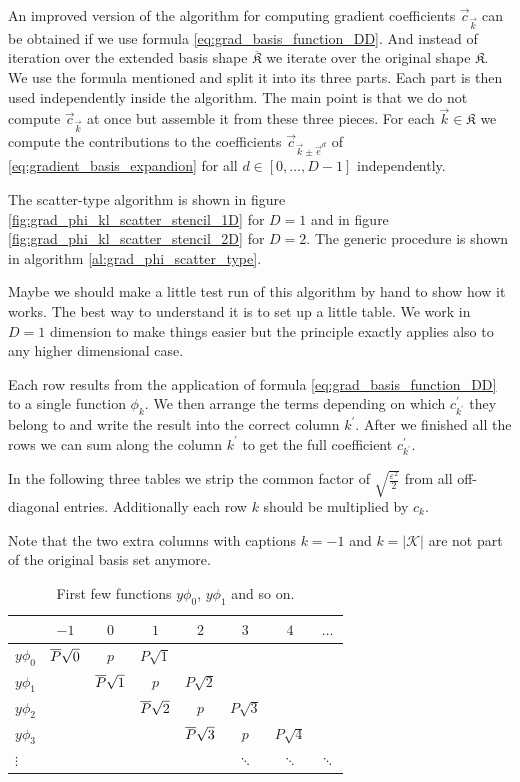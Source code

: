 An improved version of the algorithm for computing gradient coefficients $\vec{c}_{\vec{k}}$
can be obtained if we use formula \eqref{eq:grad_basis_function_DD}. And instead
of iteration over the extended basis shape $\overline{\mathfrak{K}}$ we iterate
over the original shape $\mathfrak{K}$. We use the formula mentioned and split it
into its three parts. Each part is then used independently inside the algorithm.
The main point is that we do not compute $\vec{c}_{\vec{k}}$ at once but assemble
it from these three pieces. For each $\vec{k} \in \mathfrak{K}$ we compute the
contributions to the coefficients $\vec{c}_{\vec{k}\pm \vec{e}^d}$ of
\eqref{eq:gradient_basis_expandion} for all $d \in [0, \ldots, D-1]$ independently.

The scatter-type algorithm is shown in figure \ref{fig:grad_phi_kl_scatter_stencil_1D}
for $D=1$ and in figure \ref{fig:grad_phi_kl_scatter_stencil_2D} for $D=2$.
The generic procedure is shown in algorithm \ref{al:grad_phi_scatter_type}.

Maybe we should make a little test run of this algorithm by hand to show how it works.
The best way to understand it is to set up a little table. We work in $D=1$ dimension
to make things easier but the principle exactly applies also to any higher
dimensional case.

Each row results from the application of formula \eqref{eq:grad_basis_function_DD}
to a single function $\phi_k$. We then arrange the terms depending on which $c^\prime_{k^\prime}$
they belong to and write the result into the correct column $k^\prime$. After we
finished all the rows we can sum along the column $k^\prime$ to get the full coefficient $c^\prime_{k^\prime}$.

In the following three tables we strip the common factor of $\sqrt{\frac{\varepsilon^2}{2}}$
from all off-diagonal entries. Additionally each row $k$ should be multiplied by $c_k$.

Note that the two extra columns with captions $k=-1$ and $k=|\mathcal{K}|$ are not part of
the original basis set anymore.

\begin{table}
\begin{center}
\begin{tabular}[]{|l|c|cccccc|}
\hline
           & $-1$ & $0$ & $1$ & $2$ & $3$ & $4$ & $\hdots$ \\
\hline
$y \phi_0$ & $\overline{P} \sqrt{0}$ & $p$ & $P \sqrt{1}$ & & & & \\
$y \phi_1$ & & $\overline{P} \sqrt{1}$ & $p$ & $P \sqrt{2}$ & & & \\
$y \phi_2$ & & & $\overline{P} \sqrt{2}$ & $p$ & $P \sqrt{3}$ & & \\
$y \phi_3$ & & & & $\overline{P} \sqrt{3}$ & $p$ & $P \sqrt{4}$ & \\
$\vdots$   & & & & & $\ddots$ & $\ddots$ & $\ddots$ \\
\hline
\end{tabular}
\caption{First few functions $y \phi_0$, $y \phi_1$ and so on.}
\end{center}
\end{table}


